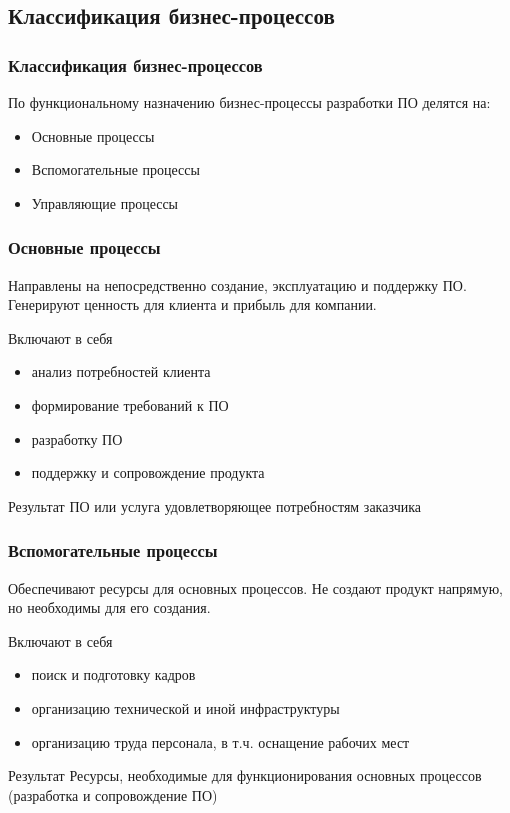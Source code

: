 \documentclass{../industrial-development}
\begin{document}
\subsection{Классификация бизнес-процессов}


\begin{frame} \frametitle{Классификация бизнес-процессов}
	По функциональному назначению бизнес-процессы разработки ПО делятся на:
	\begin{itemize}
		\item Основные процессы
		\item Вспомогательные процессы
		\item Управляющие процессы
	\end{itemize}
\end{frame}
\lecturenotes


\begin{frame} \frametitle{Основные процессы}
	Направлены на непосредственно создание, эксплуатацию и поддержку ПО. Генерируют ценность для клиента и прибыль для компании.
	
	\begin{block}{Включают в себя}
		\begin{itemize}
			\item анализ потребностей клиента
			\item формирование требований к ПО
			\item разработку ПО
			\item поддержку и сопровождение продукта
		\end{itemize}
	\end{block}
	\begin{block}{Результат}
		ПО или услуга удовлетворяющее потребностям заказчика
	\end{block}
\end{frame}
\lecturenotes


\begin{frame} \frametitle{Вспомогательные процессы}
	Обеспечивают ресурсы для основных процессов. Не создают продукт напрямую, но необходимы для его создания.

	\begin{block}{Включают в себя}
		\begin{itemize}
			\item поиск и подготовку кадров
			\item организацию технической и иной инфраструктуры
			\item организацию труда персонала, в т.ч. оснащение рабочих мест
		\end{itemize}
	\end{block}
	\begin{block}{Результат}
		Ресурсы, необходимые для функционирования основных процессов (разработка и сопровождение ПО)
	\end{block}
\end{frame}
\lecturenotes
\end{document}

